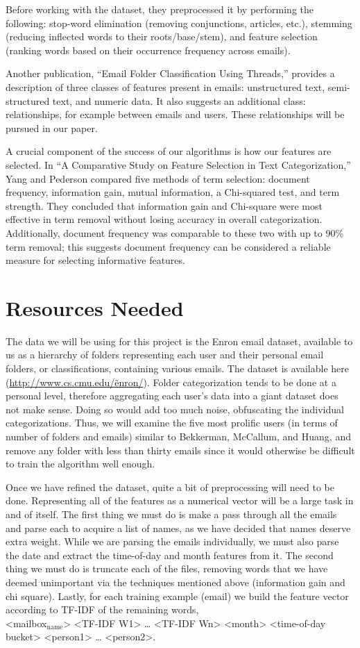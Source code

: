 \documentclass[11pt]{article}
\begin{document}
Before working with the dataset, they preprocessed it by performing the following: stop-word elimination (removing conjunctions, articles, etc.), stemming (reducing inflected words to their roots/base/stem), and feature selection (ranking words based on their occurrence frequency across emails).

Another publication, “Email Folder Classification Using Threads,” provides a description of three classes of features present in emails: unstructured text, semi-structured text, and numeric data. It also suggests an additional class: relationships, for example between emails and users. These relationships will be pursued in our paper.

A crucial component of the success of our algorithms is how our features are selected.  In “A Comparative Study on Feature Selection in Text Categorization,” Yang and Pederson compared five methods of term selection: document frequency, information gain, mutual information, a Chi-squared test, and term strength.  They concluded that information gain and Chi-square were most effective in term removal without losing accuracy in overall categorization.  Additionally, document frequency was comparable to these two with up to 90\% term removal; this suggests document frequency can be considered a reliable measure for selecting informative features.
\section{Resources Needed}
\label{sec-3}


The data we will be using for this project is the Enron email dataset, available to us as a hierarchy of folders representing each user and their personal email folders, or classifications, containing various emails. The dataset is available here (\href{http://www.cs.cmu.edu/~enron/}{http://www.cs.cmu.edu/\~enron/}). Folder categorization tends to be done at a personal level, therefore aggregating each user's data into a giant dataset does not make sense. Doing so would add too much noise, obfuscating the individual categorizations. Thus, we will examine the five most prolific users (in terms of number of folders and emails) similar to Bekkerman, McCallum, and Huang, and remove any folder with less than thirty emails since it would otherwise be difficult to train the algorithm well enough.

Once we have refined the dataset, quite a bit of preprocessing will need to be done. Representing all of the features as a numerical vector will be a large task in and of itself. The first thing we must do is make a pass through all the emails and parse each to acquire a list of names, as we have decided that names deserve extra weight. While we are parsing the emails individually, we must also parse the date and extract the time-of-day and month features from it. The second thing we must do is truncate each of the files, removing words that we have deemed unimportant via the techniques mentioned above (information gain and chi square). Lastly, for each training example (email) we build the feature vector according to TF-IDF of the remaining words, \\<mailbox$_{\mathrm{name}}$> <TF-IDF W1> … <TF-IDF Wn> <month> <time-of-day bucket> <person1> … <person2>.
\end{document}
